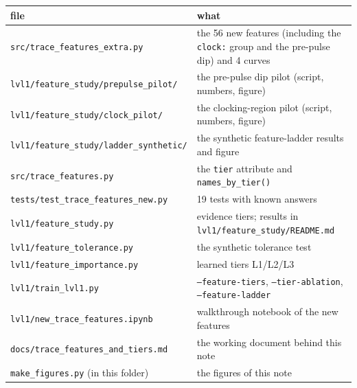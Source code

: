 \documentclass[10pt]{article}
\newcommand{\code}[1]{\texttt{#1}}
\begin{document}
\begin{table}[H]
\centering\small
\begin{tabularx}{\textwidth}{>{\raggedright\arraybackslash}p{6.2cm}L}
\toprule
file & what \\
\midrule
\code{src/trace\_features\_extra.py} & the 56 new features (including the \code{clock:} group and the pre-pulse dip) and 4 curves \\
\code{lvl1/feature\_study/prepulse\_pilot/} & the pre-pulse dip pilot (script, numbers, figure) \\
\code{lvl1/feature\_study/clock\_pilot/} & the clocking-region pilot (script, numbers, figure) \\
\code{lvl1/feature\_study/ladder\_synthetic/} & the synthetic feature-ladder results and figure \\
\code{src/trace\_features.py} & the \code{tier} attribute and \code{names\_by\_tier()} \\
\code{tests/test\_trace\_features\_new.py} & 19 tests with known answers \\
\code{lvl1/feature\_study.py} & evidence tiers; results in \code{lvl1/feature\_study/README.md} \\
\code{lvl1/feature\_tolerance.py} & the synthetic tolerance test \\
\code{lvl1/feature\_importance.py} & learned tiers L1/L2/L3 \\
\code{lvl1/train\_lvl1.py} & \code{--feature-tiers}, \code{--tier-ablation}, \code{--feature-ladder} \\
\code{lvl1/new\_trace\_features.ipynb} & walkthrough notebook of the new features \\
\code{docs/trace\_features\_and\_tiers.md} & the working document behind this note \\
\code{make\_figures.py} (in this folder) & the figures of this note \\
\bottomrule
\end{tabularx}
\end{table}
\end{document}
